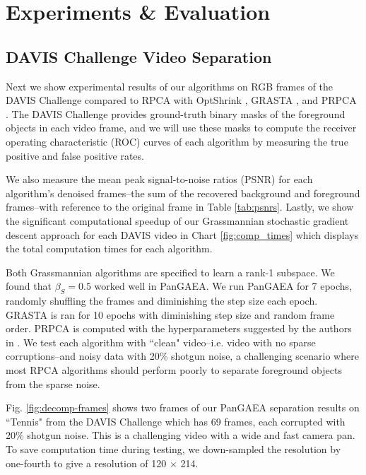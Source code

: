 \documentclass[10pt,twocolumn,letterpaper]{article}
\begin{document}
\section{Experiments \& Evaluation} \label{section:experiments}

\subsection{DAVIS Challenge Video Separation}

Next we show experimental results of our algorithms on RGB frames of the DAVIS Challenge \cite{DAVIS} compared to RPCA with OptShrink \cite{candes, B.Moore}, GRASTA \cite{grasta}, and PRPCA \cite{B.Moore}. The DAVIS Challenge provides ground-truth binary masks of the foreground objects in each video frame, and we will use these masks to compute the receiver operating characteristic (ROC) curves of each algorithm by measuring the true positive and false positive rates.

We also measure the mean peak signal-to-noise ratios (PSNR) for each algorithm's denoised frames--the sum of the recovered background and foreground frames--with reference to the original frame in Table \ref{tab:psnrs}. Lastly, we show the significant computational speedup of our Grassmannian stochastic gradient descent approach for each DAVIS video in Chart \ref{fig:comp_times} which displays the total computation times for each algorithm.

Both Grassmannian algorithms are specified to learn a rank-1 subspace. We found that $\beta_S = 0.5$ worked well in PanGAEA. We run PanGAEA for 7 epochs, randomly shuffling the frames and diminishing the step size each epoch. GRASTA is ran for 10 epochs with diminishing step size and random frame order. PRPCA is computed with the hyperparameters suggested by the authors in \cite{B.Moore}. We test each algorithm with ``clean" video--i.e. video with no sparse corruptions--and noisy data with 20\% shotgun noise, a challenging scenario where most RPCA algorithms should perform poorly to separate foreground objects from the sparse noise. 

Fig. \ref{fig:decomp-frames} shows two frames of our PanGAEA separation results on ``Tennis" from the DAVIS Challenge \cite{DAVIS} which has 69 frames, each corrupted with 20\% shotgun noise. This is a challenging video with a wide and fast camera pan. To save computation time during testing, we down-sampled the resolution by one-fourth to give a resolution of 120 $\times$ 214.
\end{document}
